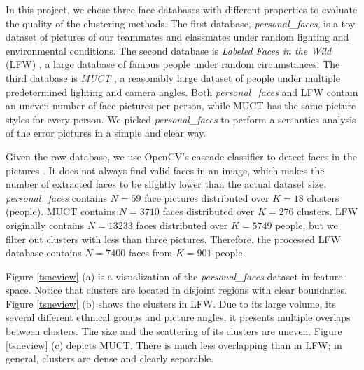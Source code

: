\documentclass[conference]{IEEEtran}
\begin{document}
In this project, we chose three face databases with different properties to evaluate the quality of the clustering methods.
The first database, \textit{personal\_faces}, is a toy dataset of pictures of our teammates and classmates under random lighting and environmental conditions.
The second database is \textit{Labeled Faces in the Wild} (LFW) \cite{??}, a large database of famous people under random circumstances.
The third database is \textit{MUCT} \cite{??}, a reasonably large dataset of people under multiple predetermined lighting and camera angles.
Both \textit{personal\_faces} and LFW contain an uneven number of face pictures per person, while MUCT has the same picture styles for every person.
We picked \textit{personal\_faces} to perform a semantics analysis of the error pictures in a simple and clear way.

Given the raw database, we use OpenCV's cascade classifier to detect faces in the pictures \cite{??}.
It does not always find valid faces in an image, which makes the number of extracted faces to be slightly lower than the actual dataset size.
\textit{personal\_faces} contains $N = 59$ face pictures distributed over $K = 18$ clusters (people).
MUCT contains $N = 3710$ faces distributed over $K = 276$ clusters.
LFW originally contains $N = 13233$ faces distributed over $K = 5749$ people, but we filter out clusters with less than three pictures.
Therefore, the processed LFW database contains $N = 7400$ faces from $K = 901$ people.

Figure \ref{tsneview} (a) is a visualization of the \textit{personal\_faces} dataset in feature-space.
Notice that clusters are located in disjoint regions with clear boundaries.
Figure \ref{tsneview} (b) shows the clusters in LFW.
Due to its large volume, its several different ethnical groups and picture angles, it presents multiple overlaps between clusters.
The size and the scattering of its clusters are uneven.
Figure \ref{tsneview} (c) depicts MUCT.
There is much less overlapping than in LFW; in general, clusters are dense and clearly separable.
\end{document}

